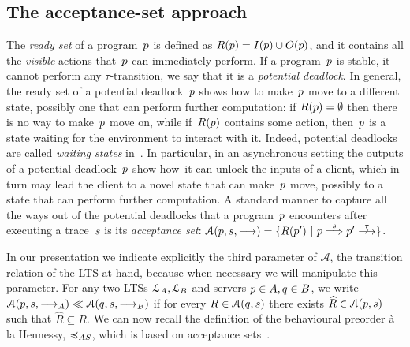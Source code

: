 \subsection{The acceptance-set approach} 
The {\em ready set} of a program~$p$ is defined as
 $R( p ) = I( p ) \cup O( p )$,
and it contains all the {\em visible} actions that~$p$ can
immediately
perform.  If a program~$p$ is
stable, \ie it cannot perform any
$\tau$-transition, we say that it is a {\em potential
  deadlock}.  In general, the ready set of a potential
deadlock~$p$ shows how to make~$p$ move to a different
state, possibly one that can perform further computation: if
$R( p ) = \emptyset$ then there is no way to make~$p$ move
on, while if~$R( p )$ contains some action, then~$p$ is
a state waiting for the environment to interact with it.
Indeed, potential deadlocks are called {\em waiting states}
in~\cite{DBLP:conf/ecoop/HondaT91}.
In particular, in an asynchronous setting the outputs of a
potential deadlock~$p$ show how~it %
can unlock the inputs
of a client, which in turn may lead the client to a novel state that
can make~$p$ move, possibly to a state that can perform further
computation.
A standard manner to capture all the ways out of the potential
deadlocks that a program~$p$ encounters after executing a
trace~$s$ is its {\em acceptance set}:
$\accP{ \server }{ \trace }{ \st{} } = \setof{ R( \stateA ) }{ \state \wt{ \trace } \stateA \stable }$.

In our presentation we indicate explicitly the third parameter of
$\mathcal{A}$, \ie the transition relation of the LTS at hand, because
when necessary we will manipulate this parameter.
For any two LTSs $\mathcal{L}_A, \mathcal{L}_B$ and servers
  $ p \in A, q \in B$, we 
  write $\mathcal{A}( p , s ,\mathrel{\overset{}\longrightarrow}_A) \ll \mathcal{A}(
    q , s , \mathrel{\overset{}\longrightarrow}_B)$ %
  if for every
  $R \in \mathcal{A}( q , s )$ there exists
  $\widehat{R} \in \mathcal{A}( p , s)$ such that $\widehat{R}
  \subseteq R$.
  We can now recall the definition of the behavioural preorder à la
  Hennessy, $\asleq$, which is based on acceptance
  sets~\cite{DBLP:books/daglib/0066919}.

